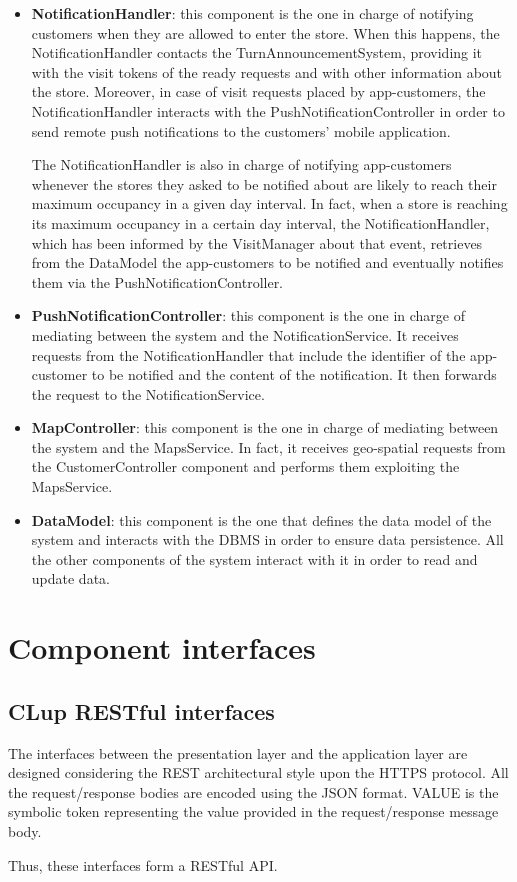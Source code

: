 \documentclass[a4paper,oneside,11pt]{book}
\begin{document}
\begin{itemize}
        \item \textbf{NotificationHandler}: this component is the one in charge of notifying customers when they are allowed to enter the store. When this happens, the NotificationHandler contacts the TurnAnnouncementSystem, providing it with the visit tokens of the ready requests and with other information about the store. Moreover, in case of visit requests placed by app-customers, the NotificationHandler interacts with the PushNotificationController in order to send remote push notifications to the customers’ mobile application. \par
        The NotificationHandler is also in charge of notifying app-customers whenever the stores they asked to be notified about are likely to reach their maximum occupancy in a given day interval. In fact, when a store is reaching its maximum occupancy in a certain day interval, the NotificationHandler, which has been informed by the VisitManager about that event, retrieves from the DataModel the app-customers to be notified and eventually notifies them via the PushNotificationController.
        \item \textbf{PushNotificationController}: this component is the one in charge of mediating between the system and the NotificationService. It receives requests from the NotificationHandler that include the identifier of the app-customer to be notified and the content of the notification. It then forwards the request to the NotificationService.
        \item \textbf{MapController}: this component is the one in charge of mediating between the system and the MapsService. In fact, it receives geo-spatial requests from the CustomerController component and performs them exploiting the MapsService. 
        \item \textbf{DataModel}: this component is the one that defines the data model of the system and interacts with the DBMS in order to ensure data persistence. All the other components of the system interact with it in order to read and update data. 
    \end{itemize}
    
    \newpage
    \section{Component interfaces}
    \subsection{CLup RESTful interfaces}
    The interfaces between the presentation layer and the application layer are designed considering the REST architectural style upon the HTTPS protocol. All the request/response bodies are encoded using the JSON format. VALUE is the symbolic token representing the value provided in the request/response message body. \par
    Thus, these interfaces form a RESTful API.
    
\end{document}
